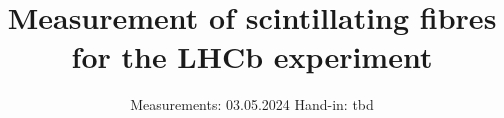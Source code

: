 

\subject{Advanced Laboratory course}
\title{Measurement of scintillating fibres for the LHCb experiment}
\date{%
  Measurements: 03.05.2024
  \hspace{3em}
  Hand-in: tbd
}



\maketitle
\thispagestyle{empty}
\tableofcontents
\newpage






\printbibliography{}


